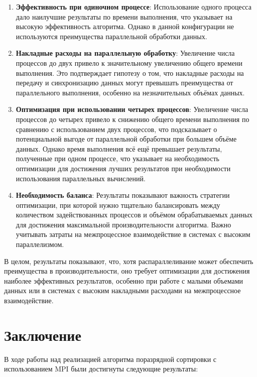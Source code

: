 \documentclass[12pt]{article}
\begin{document}
\begin{enumerate}
    \item \textbf{Эффективность при одиночном процессе}: Использование одного процесса дало наилучшие результаты по времени выполнения, что указывает на высокую эффективность алгоритма. Однако в данной конфигурации не используются преимущества параллельной обработки данных.

    \item \textbf{Накладные расходы на параллельную обработку}: Увеличение числа процессов до двух привело к значительному увеличению общего времени выполнения. Это подтверждает гипотезу о том, что накладные расходы на передачу и синхронизацию данных могут превышать преимущества от параллельного выполнения, особенно на незначительных объёмах данных.

    \item \textbf{Оптимизация при использовании четырех процессов}: Увеличение числа процессов до четырех привело к снижению общего времени выполнения по сравнению с использованием двух процессов, что подсказывает о потенциальной выгоде от параллельной обработки при большем объёме данных. Однако время выполнения всё ещё превышает результаты, полученные при одном процессе, что указывает на необходимость оптимизации для достижения лучших результатов при необходимости использования параллельных вычислений.

    \item \textbf{Необходимость баланса}: Результаты показывают важность стратегии оптимизации, при которой нужно тщательно балансировать между количеством задействованных процессов и объёмом обрабатываемых данных для достижения максимальной производительности алгоритма. Важно учитывать затраты на межпроцессное взаимодействие в системах с высоким параллелизмом.
\end{enumerate}

В целом, результаты показывают, что, хотя распараллеливание может обеспечить преимущества в производительности, оно требует оптимизации для достижения наиболее эффективных результатов, особенно при работе с малыми объемами данных или в системах с высоким накладными расходами на межпроцессное взаимодействие.

\section{Заключение}

В ходе работы над реализацией алгоритма поразрядной сортировки с использованием MPI были достигнуты следующие результаты:
\end{document}
